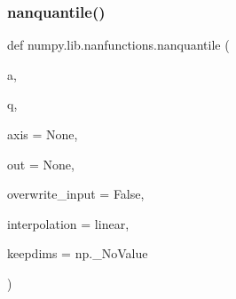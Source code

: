 \subsubsection{\texorpdfstring{nanquantile()}{nanquantile()}}
{\footnotesize\ttfamily def numpy.\+lib.\+nanfunctions.\+nanquantile (\begin{DoxyParamCaption}\item[{}]{a,  }\item[{}]{q,  }\item[{}]{axis = {\ttfamily None},  }\item[{}]{out = {\ttfamily None},  }\item[{}]{overwrite\+\_\+input = {\ttfamily False},  }\item[{}]{interpolation = {\ttfamily \textquotesingle{}linear\textquotesingle{}},  }\item[{}]{keepdims = {\ttfamily np.\+\_\+NoValue} }\end{DoxyParamCaption})}


